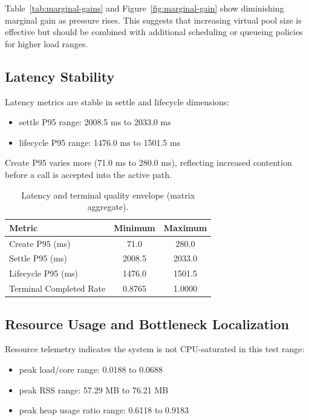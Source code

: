 \documentclass[12pt,a4paper]{report}
\begin{document}
Table~\ref{tab:marginal-gains} and Figure~\ref{fig:marginal-gain} show diminishing marginal gain as pressure rises. This suggests that increasing virtual pool size is effective but should be combined with additional scheduling or queueing policies for higher load ranges.

\subsection{Latency Stability}
\label{subsec:latency-stability}
Latency metrics are stable in settle and lifecycle dimensions:
\begin{itemize}
  \item settle P95 range: 2008.5 ms to 2033.0 ms
  \item lifecycle P95 range: 1476.0 ms to 1501.5 ms
\end{itemize}

Create P95 varies more (71.0 ms to 280.0 ms), reflecting increased contention before a call is accepted into the active path.

\begin{table}[H]
\centering
\caption{Latency and terminal quality envelope (matrix aggregate).}
\label{tab:latency-envelope}
\begin{tabular}{lcc}
\toprule
Metric & Minimum & Maximum \\
\midrule
Create P95 (ms) & 71.0 & 280.0 \\
Settle P95 (ms) & 2008.5 & 2033.0 \\
Lifecycle P95 (ms) & 1476.0 & 1501.5 \\
Terminal Completed Rate & 0.8765 & 1.0000 \\
\bottomrule
\end{tabular}
\end{table}

\subsection{Resource Usage and Bottleneck Localization}
\label{subsec:resource-bottleneck}
Resource telemetry indicates the system is not CPU-saturated in this test range:
\begin{itemize}
  \item peak load/core range: 0.0188 to 0.0688
  \item peak RSS range: 57.29 MB to 76.21 MB
  \item peak heap usage ratio range: 0.6118 to 0.9183
\end{itemize}
\end{document}
